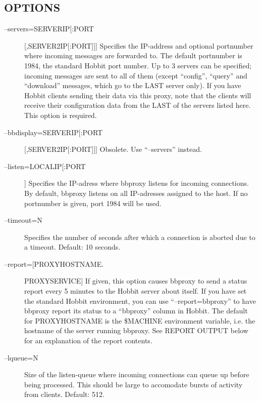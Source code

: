  
\subsection{OPTIONS}
\begin{description}
\item[--servers=SERVERIP[:PORT][,SERVER2IP[:PORT]]] Specifies the IP-address and optional portnumber where incoming messages are forwarded to. The default portnumber is 1984, the standard Hobbit port number. Up to 3 servers can be specified; incoming messages are sent to all of them (except ``config'', ``query'' and ``download'' messages, which go to the LAST server only). If you have Hobbit clients sending their data via this proxy, note that the clients will receive their configuration data from the LAST of the servers listed here. This option is required. 

 

\item[--bbdisplay=SERVERIP[:PORT][,SERVER2IP[:PORT]]] Obsolete. Use ``--servers'' instead. 

 

\item[--listen=LOCALIP[:PORT]] Specifies the IP-adress where bbproxy listens for incoming connections. By default, bbproxy listens on all IP-adresses assigned to the host. If no portnumber is given, port 1984 will be used. 

 

\item[--timeout=N] Specifies the number of seconds after which a connection is aborted due to a timeout. Default: 10 seconds. 

 

\item[--report=[PROXYHOSTNAME.]PROXYSERVICE] If given, this option causes bbproxy to send a status report every 5 minutes to the Hobbit server about itself. If you have set the standard Hobbit environment, you can use ``--report=bbproxy'' to have bbproxy report its status to a ``bbproxy'' column in Hobbit. The default for PROXYHOSTNAME is the \$MACHINE environment variable, i.e. the hostname of the server running bbproxy. See REPORT OUTPUT below for an explanation of the report contents. 

 

\item[--lqueue=N] Size of the listen-queue where incoming connections can queue up before being processed. This should be large to accomodate bursts of activity from clients. Default: 512. 


\end{description}
